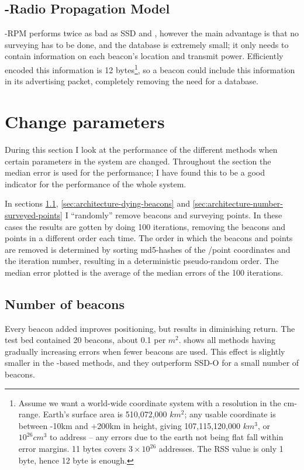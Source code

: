 \subsection{\BRP-Radio Propagation Model}
\aBRP-RPM performs twice as bad as SSD and \aBRP, however the main advantage is that no surveying has to be done, and the database is extremely small; it only needs to contain information on each beacon's location and transmit power.
Efficiently encoded this information is 12 bytes\footnote{
    Assume we want a world-wide coordinate system with a resolution in the cm-range.
    Earth's surface area is 510,072,000 $km^2$; any usable coordinate is between -10km and +200km in height, giving 107,115,120,000 $km^3$, or $10^{26} cm^3$ to address -- any errors due to the earth not being flat fall within error margins.
    11 bytes covers $3\times 10^{26}$ addresses.
    The RSS value is only 1 byte, hence 12 byte is enough.
}, so a beacon could include this information in its advertising packet, completely removing the need for a database.

\section{Change parameters}
During this section I look at the performance of the different methods when certain parameters in the system are changed.
Throughout the section the median error is used for the performance; I have found this to be a good indicator for the performance of the whole system.

In sections \ref{sec:architecture-number-beacons}, \ref{sec:architecture-dying-beacons} and \ref{sec:architecture-number-surveyed-points} I ``randomly'' remove beacons and surveying points.
In these cases the results are gotten by doing 100 iterations, removing the beacons and points in a different order each time.
The order in which the beacons and points are removed is determined by sorting md5-hashes of the \bid/point coordinates and the iteration number, resulting in a deterministic pseudo-random order.
The median error plotted is the average of the median errors of the 100 iterations.


\subsection{Number of beacons}
\label{sec:architecture-number-beacons}
Every beacon added improves positioning, but results in diminishing return.
The test bed contained 20 beacons, about 0.1 per $m^2$.
 shows all methods having gradually increasing errors when fewer beacons are used.
This effect is slightly smaller in the \aBRP-based methods, and they outperform SSD-O for a small number of beacons.


